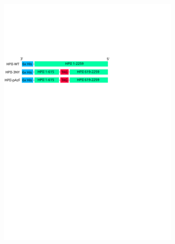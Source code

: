 \documentclass[journal=jacsat,manuscript=article]{achemso}
\begin{document}
\begin{figure}[h!]
  \centering
  \begin{subfigure}{0.49\textwidth}
    \begin{minipage}{0.1\textwidth}\caption{}\end{minipage}%
    \begin{minipage}{0.9\textwidth}\includegraphics[width=0.9\linewidth]{figures/gene-diagram}\end{minipage}
  \end{subfigure}
  \begin{subfigure}{0.49\textwidth}
    \begin{minipage}{0.1\textwidth}\caption{}\end{minipage}%

\end{subfigure}
\end{figure}
\end{document}
